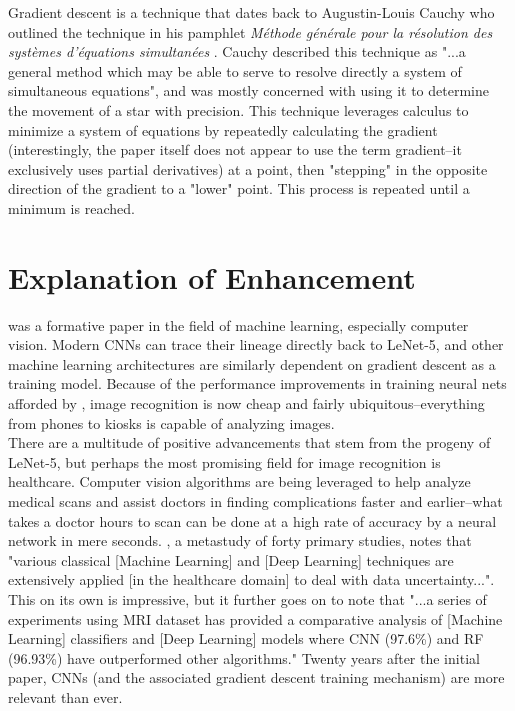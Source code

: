 \documentclass[11pt, a4paper]{article}
\begin{document}
Gradient descent is a technique that dates back to Augustin-Louis Cauchy who outlined the technique in his pamphlet 
\textit{M\'ethode g\'en\'erale pour la r\'esolution des syst\`emes d'\'equations simultan\'ees} \cite{cauchy}. Cauchy described this technique as "...a general 
method which may be able to serve to resolve directly a system of simultaneous equations", and was mostly concerned
with using it to determine the movement of a star with precision. This technique leverages calculus to minimize a system of equations by repeatedly
calculating the gradient (interestingly, the paper itself does not appear to use the term gradient--it exclusively
uses partial derivatives) at a point, then "stepping" in the opposite direction of the gradient to a "lower" point. This 
process is repeated until a minimum is reached. 

\section{Explanation of Enhancement}
\cite{lecun} was a formative paper in the field of machine learning, especially computer vision. Modern CNNs can trace 
their lineage directly back to LeNet-5, and other machine learning architectures are similarly dependent on gradient descent 
as a training model. Because of the performance improvements in training neural nets afforded by \cite{lecun}, image 
recognition is now cheap and fairly ubiquitous--everything from phones to kiosks is capable of analyzing images. \\

There are a multitude of positive advancements that stem from the progeny of LeNet-5, but perhaps the most promising field 
for image recognition is healthcare. Computer vision algorithms are being leveraged to help analyze medical scans and assist 
doctors in finding complications faster and earlier--what takes a doctor hours to scan can be done at a high rate of accuracy
by a neural network in mere seconds. \cite{rana}, a metastudy of forty primary studies, notes that "various 
classical [Machine Learning] and [Deep Learning] techniques are extensively applied [in the healthcare domain] to deal with 
data uncertainty...". This on its own is impressive, but it further goes on to note that "...a series of experiments using 
MRI dataset has provided a comparative analysis of [Machine Learning] classifiers and [Deep Learning] models where CNN (97.6\%) 
and RF (96.93\%) have outperformed other algorithms." \cite{rana} Twenty years after the initial paper, CNNs (and the associated 
gradient descent training mechanism) are more relevant than ever. \\
\end{document}
